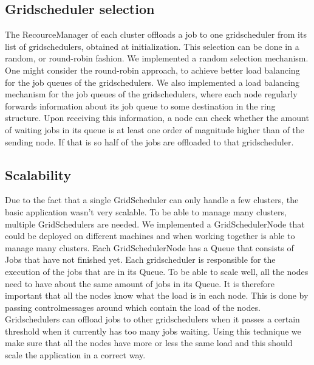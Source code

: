 \documentclass[twocolumn,a4paper]{article}
\begin{document}
\subsection{Gridscheduler selection}
The RecourceManager of each cluster offloads a job to one gridscheduler from its list of gridschedulers, obtained at initialization. This selection can be done in a random, or round-robin fashion. We implemented a random selection mechanism. One might consider the round-robin approach, to achieve better load balancing for the job queues of the gridschedulers. We also implemented a load balancing mechanism for the job queues of the gridschedulers, where each node regularly forwards information about its job queue to some destination in the ring structure. Upon receiving this information, a node can check whether the amount of waiting jobs in its queue is at least one order of magnitude higher than of the sending node. If that is so half of the jobs are offloaded to that gridscheduler.


\subsection{Scalability}
Due to the fact that a single GridScheduler can only handle a few clusters, the basic application wasn't very scalable. To be able to manage many clusters, multiple GridSchedulers are needed. We implemented a  GridSchedulerNode that could be deployed on different machines and when working together is able to manage many clusters. Each GridSchedulerNode has a Queue that consists of Jobs that have not finished yet. Each gridscheduler is responsible for the execution of the jobs that are in its Queue. To be able to scale well, all the nodes need to have about the same amount of jobs in its Queue. It is therefore important that all the nodes know what the load is in each node. This is done by passing controlmessages around which contain the load of the nodes. Gridschedulers can offload jobs to other gridschedulers when it passes a certain threshold when it currently has too many jobs waiting. Using this technique we make sure that all the nodes have more or less the same load and this should scale the application in a correct way.
\end{document}
